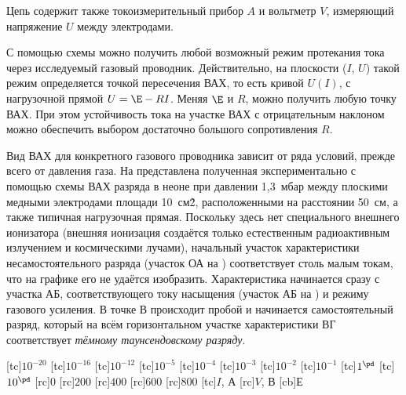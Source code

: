
Цепь содержит также токоизмерительный прибор $A$ и вольтметр $V$, измеряющий напряжение $U$ между электродами.

С помощью схемы  можно получить любой возможный режим протекания тока через исследуемый газовый проводник.
Действительно, на плоскости ($I$, $U$) такой режим определяется точкой пересечения ВАХ, то есть кривой $U(I)$, с
нагрузочной прямой $U=\E-RI$. Меняя $\E$ и $R$, можно получить любую точку ВАХ. При этом устойчивость тока на участке
ВАХ с отрицательным наклоном можно обеспечить выбором достаточно большого сопротивления $R$.

Вид ВАХ для конкретного газового проводника зависит от ряда условий, прежде всего от давления газа. На 
представлена полученная экспериментально с помощью схемы  ВАХ разряда в неоне при давлении 1,3~мбар между плоскими
медными электродами площади 10~см\^2, расположенными на расстоянии 50~см, а также типичная нагрузочная прямая. Поскольку
здесь нет специального внешнего ионизатора (внешняя ионизация создаётся только естественным радиоактивным излучением и
космическими лучами), начальный участок характеристики несамостоятельного разряда (участок ОА на ) соответствует
столь малым токам, что на графике его не удаётся изобразить. Характеристика начинается сразу с участка АБ,
соответствующего току насыщения (участок АБ на ) и режиму газового усиления. В точке В происходит пробой и
начинается самостоятельный разряд, который на всём горизонтальном участке характеристики ВГ соответствует \textit{тёмному
таунсендовскому разряду}.

{%
{}[tc]{\footnotesize $10^{-20}$}
[tc]{\footnotesize $10^{-16}$}
[tc]{\footnotesize $10^{-12}$}
[tc]{\footnotesize $10^{-5}$}
[tc]{\footnotesize $10^{-4}$}
[tc]{\footnotesize $10^{-3}$}
[tc]{\footnotesize $10^{-2}$}
[tc]{\footnotesize $10^{-1}$}
[tc]{\footnotesize $1^{\pd}$}
[tc]{\footnotesize $10^{\pd}$}
[rc]{\footnotesize $0$}
[rc]{\footnotesize $200$}
[rc]{\footnotesize $400$}
[rc]{\footnotesize $600$}
[rc]{\footnotesize $800$}
[tc]{$I$, А}
[rc]{$V$, В}
[cb]{Е}
}

